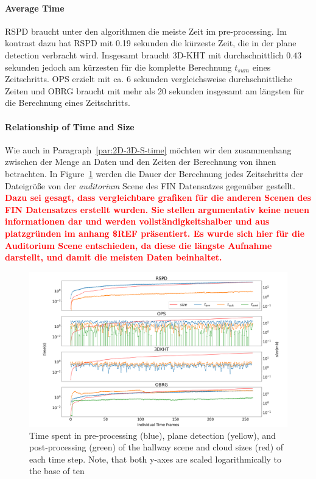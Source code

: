 \documentclass[main.tex]{subfiles}
\begin{document}
\paragraph{Average Time}
RSPD braucht unter den algorithmen die meiste Zeit im pre-processing. Im kontrast dazu hat RSPD mit 0.19 sekunden
die kürzeste Zeit, die in der plane detection verbracht wird. Insgesamt braucht 3D-KHT mit durchschnittlich $0.43$
sekunden jedoch am kürzesten für die komplette Berechnung $t_{sum}$ eines Zeitschritts. OPS erzielt mit ca. 6 sekunden vergleichsweise
durchschnittliche Zeiten und OBRG braucht mit mehr als 20 sekunden insgesamt am längsten für die Berechnung
eines Zeitschritts.

\paragraph{Relationship of Time and Size}
Wie auch in Paragraph~\ref{par:2D-3D-S-time} möchten wir den zusammenhang zwischen der Menge an Daten und den Zeiten
der Berechnung von ihnen betrachten.
In Figure~\ref{fig:dynaudi} werden die Dauer der Berechnung jedes Zeitschritts der Dateigröße von der
\textit{auditorium} Scene des FIN Datensatzes gegenüber gestellt. \textbf{\textcolor{red}{Dazu sei gesagt, dass vergleichbare grafiken
für die anderen Scenen des FIN Datensatzes erstellt wurden. Sie stellen argumentativ keine neuen informationen dar und werden 
vollständigkeitshalber und aus platzgründen im anhang \$REF präsentiert. Es wurde sich hier für die Auditorium Scene
entschieden, da diese die längste Aufnahme darstellt, und damit die meisten Daten beinhaltet.}}

\begin{figure}[H]
    \centering
    \includegraphics[width=\textwidth]{images/dyn_time-audi.png}
    \caption[Time Results Hallway]{Time spent in pre-processing (blue), plane detection (yellow), and post-processing
        (green) of the hallway scene and cloud sizes (red) of each time step. Note, that both y-axes are scaled 
        logarithmically to the base of ten}
    \label{fig:dynaudi}
\end{figure}
\end{document}
